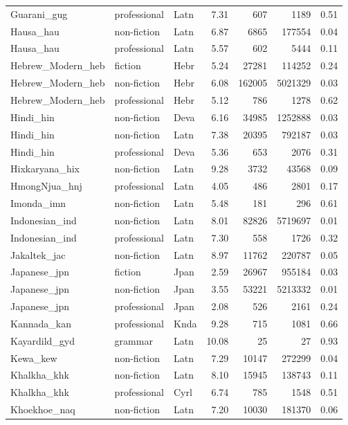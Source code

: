 \begin{longtable}{lllrrrr}
  Guarani\_gug & professional & Latn & 7.31 & 607 & 1189 & 0.51 \\ 
  Hausa\_hau & non-fiction & Latn & 6.87 & 6865 & 177554 & 0.04 \\ 
  Hausa\_hau & professional & Latn & 5.57 & 602 & 5444 & 0.11 \\ 
  Hebrew\_Modern\_heb & fiction & Hebr & 5.24 & 27281 & 114252 & 0.24 \\ 
  Hebrew\_Modern\_heb & non-fiction & Hebr & 6.08 & 162005 & 5021329 & 0.03 \\ 
  Hebrew\_Modern\_heb & professional & Hebr & 5.12 & 786 & 1278 & 0.62 \\ 
  Hindi\_hin & non-fiction & Deva & 6.16 & 34985 & 1252888 & 0.03 \\ 
  Hindi\_hin & non-fiction & Latn & 7.38 & 20395 & 792187 & 0.03 \\ 
  Hindi\_hin & professional & Deva & 5.36 & 653 & 2076 & 0.31 \\ 
  Hixkaryana\_hix & non-fiction & Latn & 9.28 & 3732 & 43568 & 0.09 \\ 
  HmongNjua\_hnj & professional & Latn & 4.05 & 486 & 2801 & 0.17 \\ 
  Imonda\_imn & non-fiction & Latn & 5.48 & 181 & 296 & 0.61 \\ 
  Indonesian\_ind & non-fiction & Latn & 8.01 & 82826 & 5719697 & 0.01 \\ 
  Indonesian\_ind & professional & Latn & 7.30 & 558 & 1726 & 0.32 \\ 
  Jakaltek\_jac & non-fiction & Latn & 8.97 & 11762 & 220787 & 0.05 \\ 
  Japanese\_jpn & fiction & Jpan & 2.59 & 26967 & 955184 & 0.03 \\ 
  Japanese\_jpn & non-fiction & Jpan & 3.55 & 53221 & 5213332 & 0.01 \\ 
  Japanese\_jpn & professional & Jpan & 2.08 & 526 & 2161 & 0.24 \\ 
  Kannada\_kan & professional & Knda & 9.28 & 715 & 1081 & 0.66 \\ 
  Kayardild\_gyd & grammar & Latn & 10.08 & 25 & 27 & 0.93 \\ 
  Kewa\_kew & non-fiction & Latn & 7.29 & 10147 & 272299 & 0.04 \\ 
  Khalkha\_khk & non-fiction & Latn & 8.10 & 15945 & 138743 & 0.11 \\ 
  Khalkha\_khk & professional & Cyrl & 6.74 & 785 & 1548 & 0.51 \\ 
  Khoekhoe\_naq & non-fiction & Latn & 7.20 & 10030 & 181370 & 0.06 \\ 

\end{longtable}
